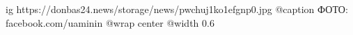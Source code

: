  
 
 
 
 

\ifcmt
  ig https://donbas24.news/storage/news/pwchuj1ko1efgnp0.jpg
	@caption ФОТО: facebook.com/uaminin
  @wrap center
  @width 0.6
\fi
